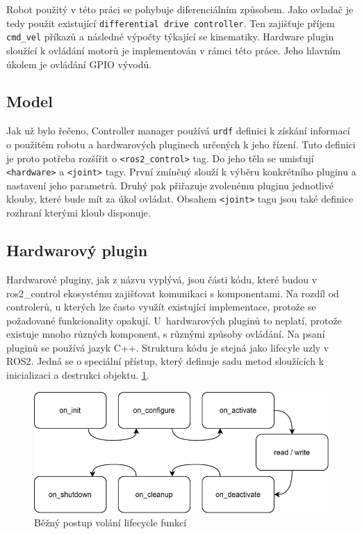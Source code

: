 Robot použitý v této práci se pohybuje diferenciálním způsobem. Jako ovladač je tedy použit existující \verb|differential drive controller|. Ten zajišťuje příjem \verb|cmd_vel| příkazů a následné výpočty týkající se kinematiky. Hardware plugin sloužící k ovládání motorů je implementován v rámci této práce. Jeho hlavním úkolem je ovládání GPIO vývodů.

\subsection*{Model}
Jak už bylo řečeno, Controller manager používá \verb|urdf| definici k získání informací o použitém robotu a hardwarových pluginech určených k jeho řízení. Tuto definici je proto potřeba rozšířit o \verb|<ros2_control>| tag. Do jeho těla se umisťují \verb|<hardware>| a \verb|<joint>| tagy. První zmíněný slouží k výběru konkrétního pluginu a nastavení jeho parametrů. Druhý pak přiřazuje zvolenému pluginu jednotlivé klouby, které bude mít za úkol ovládat. Obsahem \verb|<joint>| tagu jsou také definice rozhraní kterými kloub disponuje. \cite{ros2_control_documentation}

\subsection*{Hardwarový plugin}
Hardwarové pluginy, jak z názvu vyplývá, jsou části kódu, které budou v ros2\_control ekosystému zajišťovat komunikaci s komponentami. Na rozdíl od controlerů, u kterých lze často využít existující implementace, protože se požadované funkcionality opakují. U~hardwarových pluginů to neplatí, protože existuje mnoho různých komponent, s různými způsoby ovládání. Na psaní pluginů se používá jazyk C++. Struktura kódu je stejná jako lifecyle uzly v ROS2. Jedná se o speciální přístup, který definuje sadu metod sloužících k inicializaci a destrukci objektu. \ref{fig:lifecycle_diagram}.

\begin{figure}[h!]
	\centering
	\includegraphics[scale=0.8]{obrazky-figures/ros2_control_wh_plugin_transitions.pdf}
	\caption{Běžný postup volání lifecycle funkcí}
	\label{fig:lifecycle_diagram}
\end{figure}

